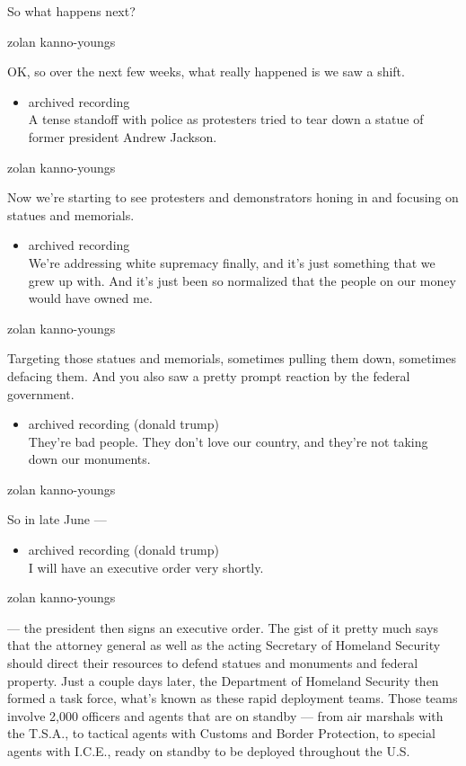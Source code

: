 So what happens next?

zolan kanno-youngs

OK, so over the next few weeks, what really happened is we saw a shift.

\begin{itemize}
\tightlist
\item
  archived recording\\
  A tense standoff with police as protesters tried to tear down a statue
  of former president Andrew Jackson.
\end{itemize}

zolan kanno-youngs

Now we're starting to see protesters and demonstrators honing in and
focusing on statues and memorials.

\begin{itemize}
\tightlist
\item
  archived recording\\
  We're addressing white supremacy finally, and it's just something that
  we grew up with. And it's just been so normalized that the people on
  our money would have owned me.
\end{itemize}

zolan kanno-youngs

Targeting those statues and memorials, sometimes pulling them down,
sometimes defacing them. And you also saw a pretty prompt reaction by
the federal government.

\begin{itemize}
\tightlist
\item
  archived recording (donald trump)\\
  They're bad people. They don't love our country, and they're not
  taking down our monuments.
\end{itemize}

zolan kanno-youngs

So in late June ---

\begin{itemize}
\tightlist
\item
  archived recording (donald trump)\\
  I will have an executive order very shortly.
\end{itemize}

zolan kanno-youngs

--- the president then signs an executive order. The gist of it pretty
much says that the attorney general as well as the acting Secretary of
Homeland Security should direct their resources to defend statues and
monuments and federal property. Just a couple days later, the Department
of Homeland Security then formed a task force, what's known as these
rapid deployment teams. Those teams involve 2,000 officers and agents
that are on standby --- from air marshals with the T.S.A., to tactical
agents with Customs and Border Protection, to special agents with
I.C.E., ready on standby to be deployed throughout the U.S.

